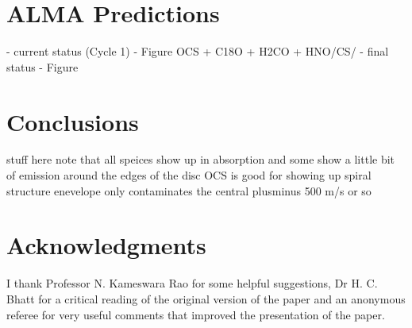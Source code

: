 \documentclass[useAMS,usenatbib]{mn2e}
\begin{document}
\section{ALMA Predictions}

- current status (Cycle 1) - Figure
OCS + C18O + H2CO + HNO/CS/
- final status - Figure 


\section{Conclusions}

stuff here
note that all speices show up in absorption and some show a little bit of emission around the edges of the disc
OCS is good for showing up spiral structure
enevelope only contaminates the central plusminus 500 m/s or so


\section*{Acknowledgments}

I thank Professor N. Kameswara Rao for some helpful suggestions,
Dr H. C. Bhatt for a critical reading of the original version of the
paper and an anonymous referee for very useful comments that improved
the presentation of the paper.
\end{document}
